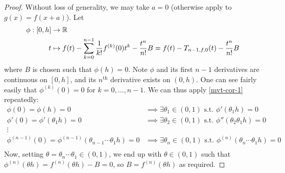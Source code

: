 \documentclass{../template/note}
\begin{document}
    \begin{proof}
        Without loss of generality, we may take \(a=0\) (otherwise apply to \(g(x) = f(x+a)\)). Let
        \begin{align*}
            \phi: [0, h] &\to \mathbb R \\
            t &\mapsto f(t) - \sum_{k=0}^{n-1} \frac{1}{k!} f^{(k)}(0)t^k - \frac{t^n}{n!}B = f(t) - T_{n-1,f,0}(t) - \frac{t^n}{n!}B
        \end{align*}
        where \(B\) is chosen such that \(\phi(h) = 0\). Note \(\phi\) and its first \(n-1\) derivatives are continuous on \([0, h]\), and its \(n^\text{th}\) derivative exists on \((0, h)\). One can see fairly easily that \(\phi^{(k)}(0) = 0\) for \(k = 0, \dots, n-1\). We can thus apply \cref{mvt-cor-1} repeatedly:
        \begin{align*}
            \phi(0) = \phi(h) = 0 &\implies \exists \theta_1 \in (0, 1) \text{ s.t. } \phi'(\theta_1h) = 0 \\
            \phi'(0) = \phi'(\theta_1h) = 0 &\implies \exists \theta_2 \in (0, 1) \text{ s.t. } \phi''(\theta_2\theta_1h) = 0 \\
            \vdots \\
            \phi^{(n-1)}(0) = \phi^{(n-1)}(\theta_{n-1}\cdots\theta_1h) = 0 &\implies \exists \theta_n \in (0, 1) \text{ s.t. } \phi^{(n)}(\theta_n\cdots\theta_1h) = 0 \\
        \end{align*}
        Now, setting \(\theta = \theta_n \cdots \theta_1 \in (0, 1)\), we end up with \(\theta \in (0, 1)\) such that \(\phi^{(n)}(\theta h) = f^{(n)}(\theta h) - B = 0\), so \(B = f^{(n)}(\theta h)\) as required.
    \end{proof}
    
\end{document}
